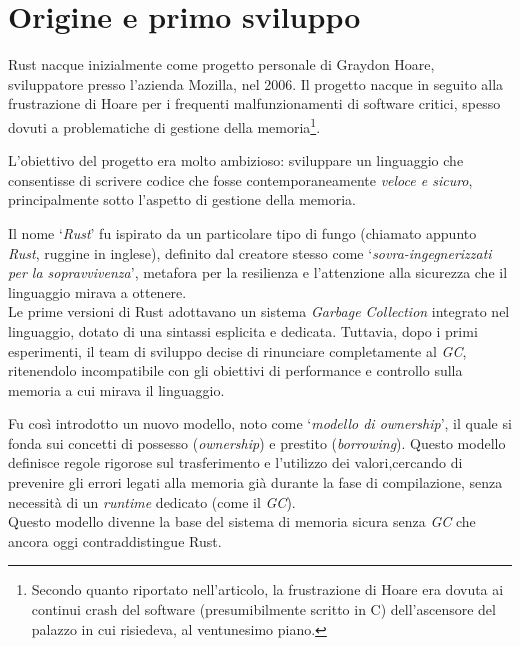 \section{Origine e primo sviluppo}
Rust nacque inizialmente come progetto personale di Graydon Hoare, sviluppatore presso l'azienda Mozilla, nel 2006.
Il progetto nacque in seguito alla frustrazione di Hoare per i frequenti malfunzionamenti di software critici, spesso dovuti 
a problematiche di gestione della memoria\footnote{Secondo quanto riportato nell'articolo\cite{rust-2023-interview}, 
la frustrazione di Hoare era dovuta ai continui crash del software (presumibilmente scritto in C) dell'ascensore del palazzo in cui risiedeva, al ventunesimo piano.}.

L'obiettivo del progetto era molto ambizioso: sviluppare un linguaggio che consentisse di scrivere codice 
che fosse contemporaneamente \textit{veloce e sicuro}, principalmente sotto l'aspetto di gestione della memoria.

Il nome `\textit{Rust}' fu ispirato da un particolare tipo di fungo (chiamato appunto \textit{Rust}, ruggine in inglese), definito dal creatore 
stesso come `\textit{sovra-ingegnerizzati per la sopravvivenza}', metafora per la resilienza e l'attenzione 
alla sicurezza che il linguaggio mirava a ottenere. \hfill
\vspace{10pt}\\
\noindent Le prime versioni di Rust adottavano un sistema \textit{Garbage Collection} integrato nel linguaggio, dotato di una sintassi esplicita e dedicata.
Tuttavia, dopo i primi esperimenti, il team di sviluppo decise di rinunciare completamente al \textit{GC}, ritenendolo incompatibile con gli obiettivi di performance 
e controllo sulla memoria a cui mirava il linguaggio.

Fu così introdotto un nuovo modello, noto come `\textit{modello di ownership}', il quale si fonda 
sui concetti di possesso (\textit{ownership}) e prestito (\textit{borrowing}). 
Questo modello definisce regole rigorose sul trasferimento e l'utilizzo dei valori,cercando di prevenire gli errori legati 
alla memoria già durante la fase di compilazione, senza necessità di un \textit{runtime} dedicato (come il \textit{GC}). \hfill
\\
\noindent Questo modello divenne la base del sistema di memoria sicura senza \textit{GC} che ancora oggi contraddistingue Rust.

